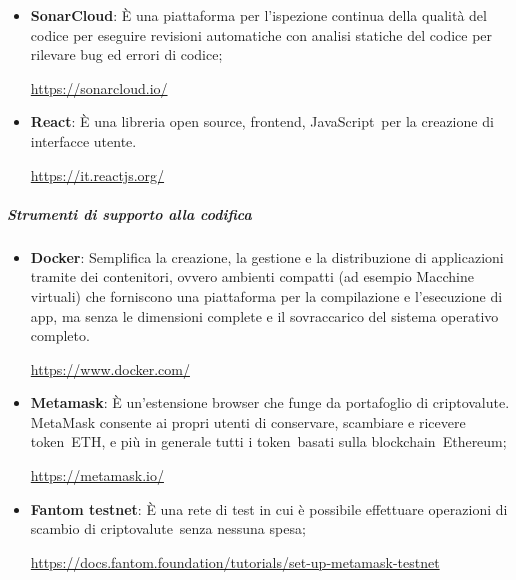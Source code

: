 \begin{itemize}
            \item \textbf{SonarCloud}: È una piattaforma per l'ispezione continua della qualità del codice per eseguire revisioni automatiche con analisi statiche del codice per rilevare bug ed errori di codice;
            \begin{center}\url{https://sonarcloud.io/}\end{center}
            \item \textbf{React}: È una libreria open source\glo , frontend\glo , JavaScript\glo\ per la creazione di interfacce utente.
            \begin{center}\url{https://it.reactjs.org/}\end{center}
        \end{itemize}
        \subparagraph{Strumenti di supporto alla codifica}
        \begin{itemize}
            \item \textbf{Docker}: Semplifica la creazione, la gestione e la distribuzione di applicazioni tramite dei contenitori, ovvero ambienti compatti (ad esempio Macchine virtuali) che forniscono una piattaforma per la compilazione e l'esecuzione di app, ma senza le dimensioni complete e il sovraccarico del sistema operativo completo.
            \begin{center}\url{https://www.docker.com/}\end{center}
            \item \textbf{Metamask}: È un'estensione browser che funge da portafoglio di criptovalute\glo. MetaMask consente ai propri utenti di conservare, scambiare e ricevere token\glo\ ETH, e più in generale tutti i token\glo\ basati sulla blockchain\glo\ Ethereum\glo ;
            \begin{center}\url{https://metamask.io/}\end{center}
            \item \textbf{Fantom testnet}: È una rete di test in cui è possibile effettuare operazioni di scambio di criptovalute\glo\ senza nessuna spesa;
            \begin{center}\url{https://docs.fantom.foundation/tutorials/set-up-metamask-testnet}\end{center}
        \end{itemize}

